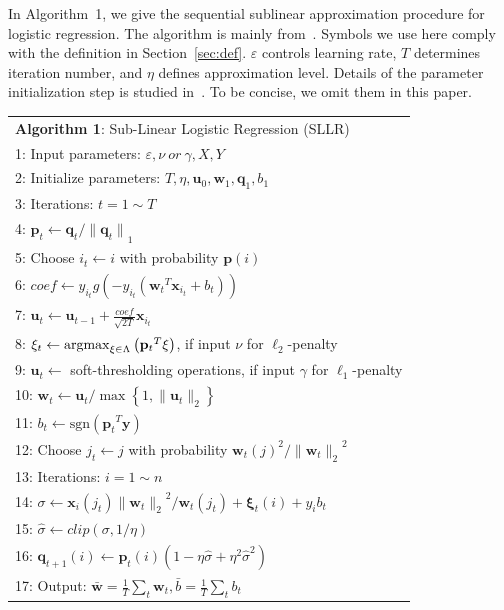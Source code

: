 \documentclass[10pt, conference, compsocconf]{IEEEtran}
\newcommand{\bw}{\mathbf{w}}
\newcommand{\bu}{\mathbf{u}}
\newcommand{\bp}{\mathbf{p}}
\newcommand{\bq}{\mathbf{q}}
\newcommand{\bxi}{\mathbf{\xi}}
\newcommand{\lc}{\left(}
\newcommand{\rc}{\right)}
\newcommand{\li}{\lc i\rc}
\newcommand{\lj}{\lc j\rc}
\newcommand{\tspace}{\hspace*{2em}}
\newcommand{\tspaces}{\hspace*{1.5em}}
\def\argmax{\mathop{\rm argmax}}
\def\sgn{\mathrm{sgn}}
\begin{document}
In Algorithm~1, we give the sequential sublinear approximation procedure for logistic regression. The algorithm is mainly from~\cite{peng2012sublinear}. Symbols we use here comply with the definition in Section~\ref{sec:def}. $\varepsilon$ controls learning rate, $T$ determines iteration number, and $\eta$ defines approximation level. Details of the parameter initialization step is studied in~\cite{peng2012sublinear}. To be concise, we omit them in this paper.
	\begin{table} [ht]
	\begin{tabular}{l}
	\hline\noalign{\smallskip}
	\textbf{Algorithm 1}: Sub-Linear Logistic Regression (SLLR) \\
	\noalign{\smallskip}
	\hline
	\noalign{\smallskip}
	1:	Input parameters: $\varepsilon, \nu~or~\gamma, X, Y$ \\
	2:	Initialize parameters: $T, \eta, {\mathbf{u}}_{0}, {\bw}_{1}, {\mathbf{\bq}}_{1}, {b}_{1}$\\
	3:	Iterations: $t=1 \sim T$ \\
	4:	\tspace ${\bp}_{t}\leftarrow{\bq}_{t}/{\|{\bq}_{t}\|}_{1}$ \\
	5:  \tspace Choose ${i}_{t}\leftarrow i$ with probability $\bp(i)$ \\
	6:	\tspace $coef\leftarrow{y}_{{i}_{t}}g\lc-{y}_{{i}_{t}}\lc {{\bw}_{t}}^{T}{\mathbf{x}}_{i_t}+{b}_{t} \rc\rc$ \\
	7:	\tspace ${\bu}_{t}\leftarrow {\bu}_{t-1}+\frac{coef}{\sqrt{2T}}{\mathbf{x}}_{{i}_{t}}$ \\
    8:  \tspace ${\bxi}_{t}\leftarrow \argmax_{\bxi\in \Lambda}\lc{{\bp}_{t}}^{T}\bxi\rc$, if input $\nu$ for $\ell_2$-penalty \\
    9:  \tspace $\bu_t\leftarrow$ soft-thresholding operations, if input $\gamma$ for $\ell_1$-penalty \\
	10:	\tspaces ${\bw}_{t}\leftarrow {\bu}_{t}/\max \left\{1,\|{\bu}_{t}\|_2 \right\}$ \\
    11: \tspaces ${b}_{t}\leftarrow \sgn\lc {{\bp}_{t}}^{T}\mathbf{y}\rc$ \\
	12:	\tspaces Choose ${j}_{t}\leftarrow j$ with probability ${{\bw}_{t}\lj}^{2}/{\|{\bw}_{t}\|_2}^{2} $ \\
	13:	\tspaces Iterations: $i=1 \sim n$ \\
	14:	\tspaces\tspace $\sigma \leftarrow \mathbf{x}_{i} \lc {j}_{t}\rc{\|{\bw}_{t}\|_2}^{2}/{\bw}_{t}\lc {j}_{t} \rc+{\bxi}_{t}\li+{y}_{i}{b}_{t}$ \\
	15:	\tspaces\tspace $\hat{\sigma} \leftarrow clip\lc \sigma,1/\eta \rc$ \\
	16:	\tspaces\tspace ${\bq}_{t+1}\li \leftarrow {\bp}_{t}\li\lc 1-\eta\hat{\sigma} + {\eta}^{2}{\hat{\sigma}}^{2} \rc$ \\
	17:	Output: $\bar{\bw}=\frac{1}{T}\sum_{t}{\bw}_{t},\bar{b}=\frac{1}{T}\sum_{t}{b}_{t}$ \\
	\hline
	\end{tabular} 	
	\label{alg:1}
	\end{table}
\end{document}
